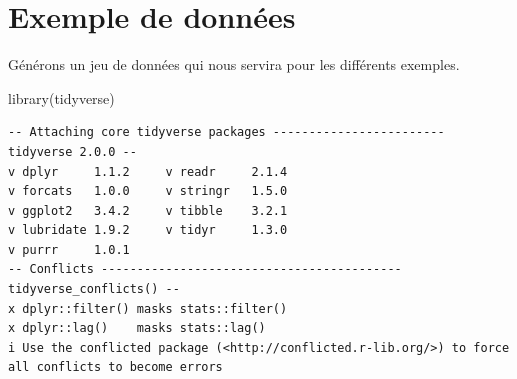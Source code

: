 \documentclass[
  letterpaper,
  DIV=11,
  numbers=noendperiod,
  oneside]{scrreprt}
\newenvironment{Shaded}{\begin{snugshade}}{\end{snugshade}}
\newcommand{\FunctionTok}[1]{\textcolor[rgb]{0.28,0.35,0.67}{#1}}
\newcommand{\NormalTok}[1]{\textcolor[rgb]{0.00,0.23,0.31}{#1}}
\begin{document}
\hypertarget{exemple-de-donnuxe9es}{%
\section{Exemple de données}\label{exemple-de-donnuxe9es}}

Générons un jeu de données qui nous servira pour les différents
exemples.

\begin{Shaded}
\begin{Highlighting}[]
\FunctionTok{library}\NormalTok{(tidyverse)}
\end{Highlighting}
\end{Shaded}

\begin{verbatim}
-- Attaching core tidyverse packages ------------------------ tidyverse 2.0.0 --
v dplyr     1.1.2     v readr     2.1.4
v forcats   1.0.0     v stringr   1.5.0
v ggplot2   3.4.2     v tibble    3.2.1
v lubridate 1.9.2     v tidyr     1.3.0
v purrr     1.0.1     
-- Conflicts ------------------------------------------ tidyverse_conflicts() --
x dplyr::filter() masks stats::filter()
x dplyr::lag()    masks stats::lag()
i Use the conflicted package (<http://conflicted.r-lib.org/>) to force all conflicts to become errors
\end{verbatim}
\end{document}
